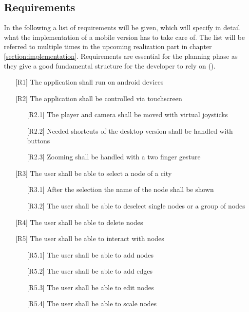 \subsection{Requirements}
In the following a list of requirements will be given, which will specify in detail what the implementation of a mobile version has to take care of.
The list will be referred to multiple times in the upcoming realization part in chapter \ref{section:implementation}.
Requirements are essential for the planning phase as they give a good fundamental structure for the developer to rely on (\cite{Robertson2012,Stevens2005}). 
\begin{itemize}
    \item[{[R1]}] The application shall run on \gls{android} devices
    \item[{[R2]}] The application shall be controlled via touchscreen
    \begin{itemize}
        \item [{[R2.1]}] The player and camera shall be moved with virtual joysticks
        \item [{[R2.2]}] Needed shortcuts of the desktop version shall be handled with buttons
        \item [{[R2.3]}] Zooming shall be handled with a two finger gesture
    \end{itemize}
    \item[{[R3]}] The user shall be able to select a \gls{node} of a \gls{city}
    \begin{itemize}
        \item [{[R3.1]}] After the selection the name of the \gls{node} shall be shown
        \item [{[R3.2]}] The user shall be able to deselect single \glspl{node} or a group of \glspl{node}
    \end{itemize}
    \item[{[R4]}] The user shall be able to delete \glspl{node}
    \item[{[R5]}] The user shall be able to interact with \glspl{node}
    \begin{itemize}
        \item [{[R5.1]}] The user shall be able to add \glspl{node}
        \item [{[R5.2]}] The user shall be able to add \glspl{edge}
        \item [{[R5.3]}] The user shall be able to edit \glspl{node}
        \item [{[R5.4]}] The user shall be able to scale \glspl{node}

\end{itemize}
\end{itemize}
